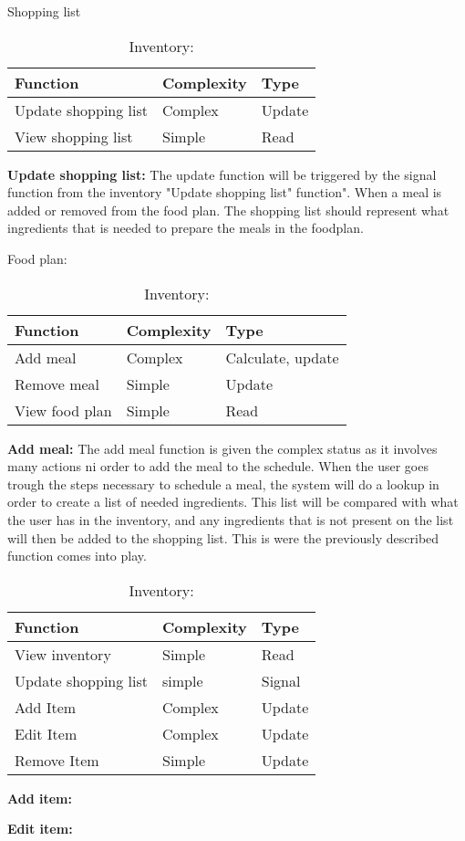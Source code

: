\begin{table}[H]
	\centering
	\caption{Shopping list}
	\begin{tabular}{|l|l|l|}\hline
		\textbf{Function}&\textbf{Complexity}&\textbf{Type}\\\hline
	  Update shopping list  &  Complex & Update \\\hline
	  View shopping list    &  Simple  & Read   \\\hline
  \end{tabular}
  \begin{flushleft}
    \textbf{Update shopping list:} The update function will be triggered by the signal function from the inventory "Update shopping list" function". When a meal is added or removed from the food plan. The shopping list should represent what ingredients that is needed to prepare the meals in the foodplan.
  \end{flushleft}
	\caption{Food plan:}
  \begin{tabular}{|l|l|l|}\hline
		\textbf{Function}&\textbf{Complexity}&\textbf{Type}\\\hline
	  Add meal              &  Complex & Calculate, update \\\hline
	  Remove meal           &  Simple  & Update            \\\hline
	  View food plan        &  Simple  & Read              \\\hline
  \end{tabular}
  \begin{flushleft}
    \textbf{Add meal:} The add meal function is given the complex status as it involves many actions ni order to add the meal to the schedule. When the user goes trough the steps necessary to schedule a meal, the system will do a lookup in order to create a list of needed ingredients. This list will be compared with what the user has in the inventory, and any ingredients that is not present on the list will then be added to the shopping list. This is were the previously described function comes into play.
  \end{flushleft}
	\caption{Inventory:}
  \begin{tabular}{|l|l|l|}\hline
		\textbf{Function}&\textbf{Complexity}&\textbf{Type}\\\hline
	  View inventory        &  Simple  & Read   \\\hline
	  Update shopping list  &  simple  & Signal \\\hline
	  Add Item              &  Complex & Update \\\hline
	  Edit Item             &  Complex & Update \\\hline
	  Remove Item           &  Simple  & Update \\\hline
  \end{tabular}
  \begin{flushleft}  	  
    \textbf{Add item:}
    
    \textbf{Edit item:}
  \end{flushleft}
\end{table}
